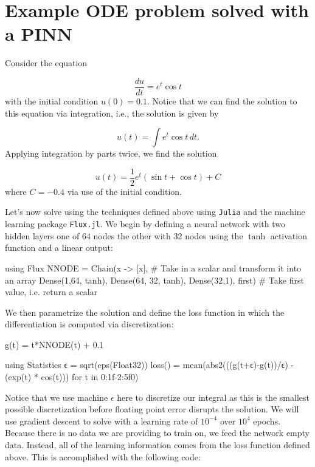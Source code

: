 \documentclass{CUP-JNL-DTM}%
\theoremstyle{definition}
\numberwithin{equation}{section}
\newcommand{\Julia}{\texttt{Julia} }
\begin{document}

\appendix

\section{Example ODE problem solved with a PINN}
\label{ODE_example}
	
Consider the equation

\begin{equation}
	\frac{du}{dt} = e^t \cos t
\end{equation}
with the initial condition $u(0) = 0.1$. Notice that we can find the solution to this equation via integration, i.e., the solution is given by

\begin{equation}
	u(t) = \int e^t \cos t \, dt. 
\end{equation}
Applying integration by parts twice, we find the solution

\begin{equation}
	u(t) = \frac{1}{2}e^t(\sin t + \cos t) + C
\end{equation}
where $C = -0.4$ via use of the initial condition. 

Let's now solve using the techniques defined above using \Julia and the machine learning package \texttt{Flux.jl}. We begin by defining a neural network with two hidden layers one of 64 nodes the other with 32 nodes using the $\tanh$ activation function and a linear output: 

\begin{jllisting}
using Flux
NNODE = Chain(x -> [x], # Take in a scalar and transform it into an array
           Dense(1,64, tanh),
           Dense(64, 32, tanh),
           Dense(32,1),
           first) # Take first value, i.e. return a scalar
\end{jllisting}
We then parametrize the solution and define the loss function in which the differentiation is computed via discretization:

\begin{jllisting}
g(t) = t*NNODE(t) + 0.1

using Statistics
ϵ = sqrt(eps(Float32))
loss() = mean(abs2(((g(t+ϵ)-g(t))/ϵ) - (exp(t) * cos(t))) for t in 0:1f-2:5f0)
\end{jllisting}
Notice that we use machine $\epsilon$ here to discretize our integral as this is the smallest possible discretization before floating point error disrupts the solution. We will use gradient descent to solve with a learning rate of $10^{-4}$ over $10^4$ epochs. Because there is no data we are providing to train on, we feed the network empty data. Instead, all of the learning information comes from the loss function defined above. This is accomplished with the following code:
\end{document}
